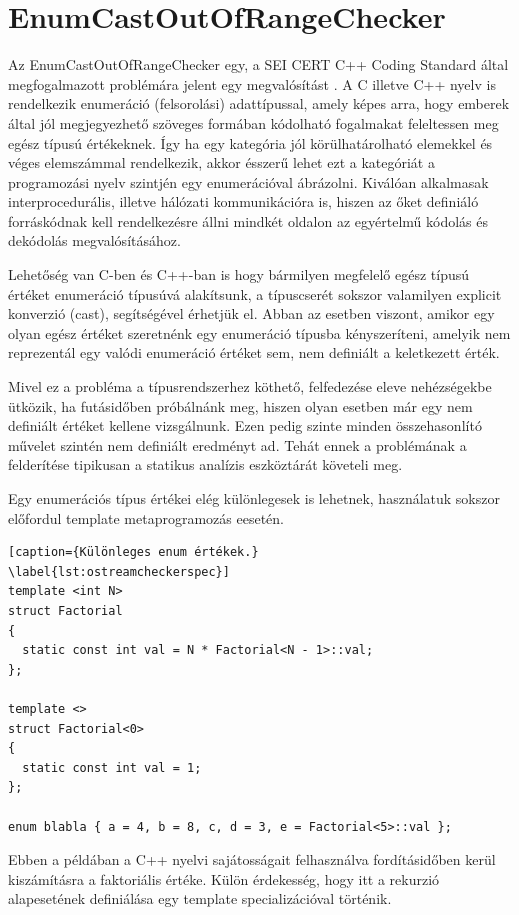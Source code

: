 \documentclass[a4paper,12pt]{report}
\begin{document}
\section{EnumCastOutOfRangeChecker}
Az EnumCastOutOfRangeChecker egy, a SEI CERT C++ Coding Standard által megfogalmazott problémára jelent egy megvalósítást \cite{securecodingint50}.
A C illetve C++ nyelv is rendelkezik enumeráció (felsorolási) adattípussal, amely képes arra, hogy emberek által jól megjegyezhető szöveges formában kódolható fogalmakat feleltessen meg egész típusú értékeknek. Így ha egy kategória jól körülhatárolható elemekkel és véges elemszámmal rendelkezik, akkor ésszerű lehet ezt a kategóriát a programozási nyelv szintjén egy enumerációval ábrázolni. Kiválóan alkalmasak interprocedurális, illetve hálózati kommunikációra is, hiszen az őket definiáló forráskódnak kell rendelkezésre állni mindkét oldalon az egyértelmű kódolás és dekódolás megvalósításához.

Lehetőség van C-ben és C++-ban is hogy bármilyen megfelelő egész típusú értéket enumeráció típusúvá alakítsunk, a típuscserét sokszor valamilyen explicit konverzió (cast), segítségével érhetjük el. Abban az esetben viszont, amikor egy olyan egész értéket szeretnénk egy enumeráció típusba kényszeríteni, amelyik nem reprezentál egy valódi enumeráció értéket sem, nem definiált a keletkezett érték.

Mivel ez a probléma a típusrendszerhez köthető, felfedezése eleve nehézségekbe ütközik, ha futásidőben próbálnánk meg, hiszen olyan esetben már egy nem definiált értéket kellene vizsgálnunk. Ezen pedig szinte minden összehasonlító művelet szintén nem definiált eredményt ad. Tehát ennek a problémának a felderítése tipikusan a statikus analízis eszköztárát követeli meg.

Egy enumerációs típus értékei elég különlegesek is lehetnek, használatuk sokszor előfordul template metaprogramozás eesetén.

\begin{lstlisting}[caption={Különleges enum értékek.}
\label{lst:ostreamcheckerspec}]
template <int N>
struct Factorial
{
  static const int val = N * Factorial<N - 1>::val;
};

template <>
struct Factorial<0>
{
  static const int val = 1;
};

enum blabla { a = 4, b = 8, c, d = 3, e = Factorial<5>::val };
\end{lstlisting}

Ebben a példában a C++ nyelvi sajátosságait felhasználva fordításidőben kerül kiszámításra a faktoriális értéke. Külön érdekesség, hogy itt a rekurzió alapesetének definiálása egy template specializációval történik.
\end{document}
